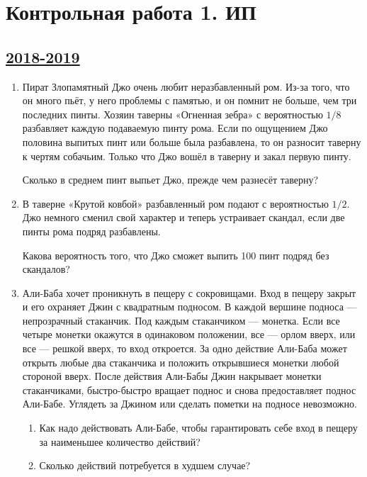 \newpage
\thispagestyle{empty}
\section{Контрольная работа 1. ИП}

\subsection[2018-2019]{\hyperref[sec:sol_kr_01_ip_2018_2019]{2018-2019}}
\label{sec:kr_01_ip_2018_2019}

\begin{enumerate}
\item Пират Злопамятный Джо очень любит неразбавленный ром. Из-за того,
что он много пьёт, у него проблемы с памятью, и он помнит не больше, чем три последних
пинты. Хозяин таверны «Огненная зебра» с вероятностью $1/8$ разбавляет каждую подаваемую пинту рома.
Если по ощущением Джо половина выпитых пинт или больше была разбавлена, то он
разносит таверну к чертям собачьим. Только что Джо вошёл в таверну и закал первую пинту.

Сколько в среднем пинт выпьет Джо, прежде чем разнесёт таверну?

\item В таверне «Крутой ковбой» разбавленный ром подают с вероятностью $1/2$.
Джо немного сменил свой характер и теперь устраивает скандал,
если две пинты рома подряд разбавлены.

Какова вероятность того, что Джо сможет выпить 100 пинт подряд без скандалов?

\item Али-Баба хочет проникнуть в пещеру с сокровищами. Вход в
пещеру закрыт и его охраняет Джин с квадратным подносом.
В каждой вершине подноса — непрозрачный стаканчик. Под
каждым стаканчиком — монетка.
Если все четыре монетки окажутся в одинаковом положении, все —
орлом вверх, или все — решкой вверх, то вход откроется.
За одно действие Али-Баба может открыть любые два стаканчика и
положить открывшиеся монетки любой стороной вверх.
После действия Али-Бабы Джин накрывает монетки стаканчиками,
быстро-быстро вращает поднос и снова предоставляет поднос
Али-Бабе.
Углядеть за Джином или сделать пометки на подносе невозможно.

\begin{enumerate}
  \item Как надо действовать Али-Бабе, чтобы гарантировать себе вход в
  пещеру за наименьшее количество действий?
  \item Сколько действий
  потребуется в худшем случае?
\end{enumerate}


\end{enumerate}
